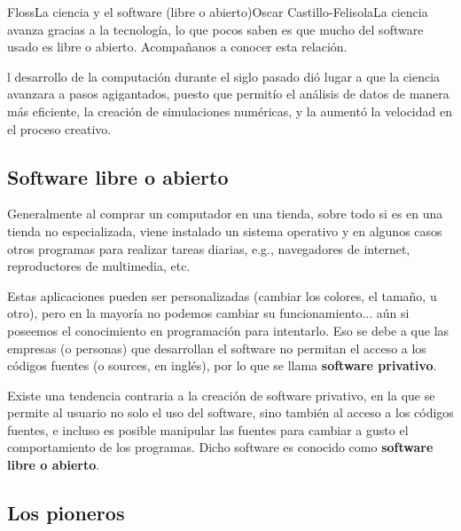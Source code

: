 

\begin{article}[2]{Floss}{La ciencia y el software (libre o abierto)}{Oscar Castillo-Felisola}{La ciencia avanza gracias a la tecnolog\'ia, lo que pocos saben es que mucho del software usado es libre o abierto. Acompa\~nanos a conocer esta relaci\'on.}
  
l desarrollo de la computaci\'on durante el siglo pasado di\'o lugar a que la ciencia avanzara a pasos agigantados, puesto que permit\'io el an\'alisis de datos de manera m\'as eficiente, la creaci\'on de simulaciones num\'ericas, y la aument\'o la velocidad en el proceso creativo.



\subsection{Software libre o abierto}

Generalmente al comprar un computador en una tienda, sobre todo si es en una tienda no especializada, viene instalado un sistema operativo y en algunos casos otros programas para realizar tareas diarias, e.g., navegadores de internet, reproductores de multimedia, etc. 

Estas aplicaciones pueden ser personalizadas (cambiar los colores, el tama\~no, u otro), pero en la mayor\'ia no podemos cambiar su funcionamiento... a\'un si poseemos el conocimiento en programaci\'on para intentarlo. Eso se debe a que las empresas (o personas) que desarrollan el software no permitan el acceso a los c\'odigos fuentes (o sources, en ingl\'es), por lo que se llama {\bf software privativo}.

Existe una tendencia contraria a la creaci\'on de software privativo, en la que se permite al usuario no solo el uso del software, sino tambi\'en al acceso a los c\'odigos fuentes, e incluso es posible manipular las fuentes para cambiar a gusto el comportamiento de los programas. Dicho software es conocido como {\bf software libre o abierto}.

\subsection{Los pioneros}


\end{article}
